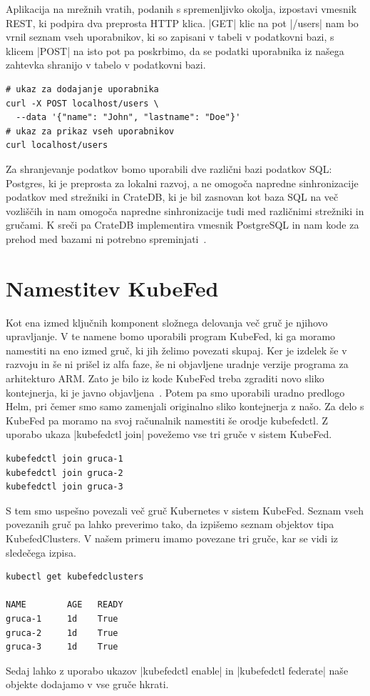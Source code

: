 \documentclass[a4paper, 12pt]{book}
\begin{document}
Aplikacija na mrežnih vratih, podanih s spremenljivko okolja, izpostavi vmesnik REST, ki podpira dva preprosta HTTP klica.
\spverb|GET| klic na pot \spverb|/users| nam bo vrnil seznam vseh uporabnikov, ki so zapisani v tabeli v podatkovni bazi, s klicem \spverb|POST| na isto pot pa poskrbimo, da se podatki uporabnika iz našega zahtevka shranijo v tabelo v podatkovni bazi.
\begin{verbatim}
# ukaz za dodajanje uporabnika
curl -X POST localhost/users \
  --data '{"name": "John", "lastname": "Doe"}'
# ukaz za prikaz vseh uporabnikov
curl localhost/users
\end{verbatim}

Za shranjevanje podatkov bomo uporabili dve različni bazi podatkov SQL: Postgres, ki je preprosta za lokalni razvoj, a ne omogoča napredne sinhronizacije podatkov med strežniki in CrateDB, ki je bil zasnovan kot baza SQL na več vozliščih in nam omogoča napredne sinhronizacije tudi med različnimi strežniki in gručami.
K sreči pa CrateDB implementira vmesnik PostgreSQL in nam kode za prehod med bazami ni potrebno spreminjati~\cite{cratedb}.
\section{Namestitev KubeFed}
Kot ena izmed ključnih komponent složnega delovanja več gruč je njihovo upravljanje.
V te namene bomo uporabili program KubeFed, ki ga moramo namestiti na eno izmed gruč, ki jih želimo povezati skupaj.
Ker je izdelek še v razvoju in še ni prišel iz alfa faze, še ni objavljene uradnje verzije programa za arhitekturo ARM.
Zato je bilo iz kode KubeFed treba zgraditi novo sliko kontejnerja, ki je javno objavljena~\cite{docker-kubefed}.
Potem pa smo uporabili uradno predlogo Helm, pri čemer smo samo zamenjali originalno sliko kontejnerja z našo.
Za delo s KubeFed pa moramo na svoj računalnik namestiti še orodje kubefedctl.
Z uporabo ukaza \spverb|kubefedctl join| povežemo vse tri gruče v sistem KubeFed.
\begin{verbatim}
kubefedctl join gruca-1
kubefedctl join gruca-2
kubefedctl join gruca-3
\end{verbatim}
S tem smo uspešno povezali več gruč Kubernetes v sistem KubeFed.
Seznam vseh povezanih gruč pa lahko preverimo tako, da izpišemo seznam objektov tipa KubefedClusters. 
V našem primeru imamo povezane tri gruče, kar se vidi iz sledečega izpisa.
\begin{verbatim}
kubectl get kubefedclusters

NAME        AGE   READY
gruca-1     1d    True
gruca-2     1d    True
gruca-3     1d    True
\end{verbatim}
Sedaj lahko z uporabo ukazov \spverb|kubefedctl enable| in \spverb|kubefedctl federate| naše objekte dodajamo v vse gruče hkrati.
\end{document}

